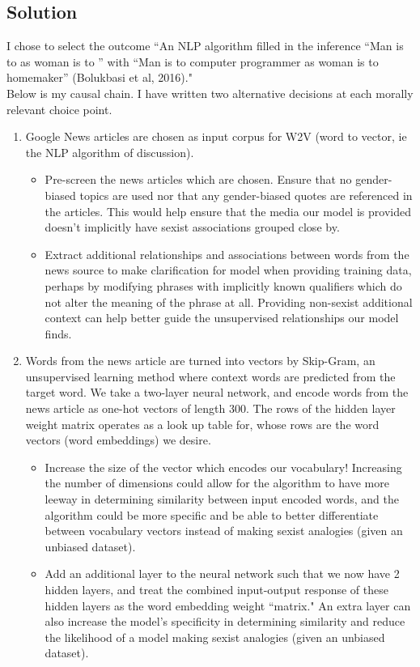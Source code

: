\documentclass[submit]{harvardml}
\begin{document}
\subsection*{Solution}
I chose to select the outcome ``An NLP algorithm filled in the inference “Man is to as woman is to ” with “Man is to computer programmer as woman is to homemaker” (Bolukbasi et al, 2016)." \\
Below is my causal chain. I have written two alternative decisions at each morally relevant choice point.
\begin{enumerate}
    \item Google News articles are chosen as input corpus for W2V (word to vector, ie the NLP algorithm of discussion).
    \begin{itemize}
        \item Pre-screen the news articles which are chosen. Ensure that no gender-biased topics are used nor that any gender-biased quotes are referenced in the articles. This would help ensure that the media our model is provided doesn't implicitly have sexist associations grouped close by.
        \item Extract additional relationships and associations between words from the news source to make clarification for model when providing training data, perhaps by modifying phrases with implicitly known qualifiers which do not alter the meaning of the phrase at all. Providing non-sexist additional context can help better guide the unsupervised relationships our model finds.
    \end{itemize}
    \item Words from the news article are turned into vectors by Skip-Gram, an unsupervised learning method where context words are predicted from the target word. We take a two-layer neural network, and encode words from the news article as one-hot vectors of length 300. The rows of the hidden layer weight matrix operates as a look up table for, whose rows are the word vectors (word embeddings) we desire.
    \begin{itemize}
        \item Increase the size of the vector which encodes our vocabulary! Increasing the number of dimensions could allow for the algorithm to have more leeway in determining similarity between input encoded words, and the algorithm could be more specific and be able to better differentiate between vocabulary vectors instead of making sexist analogies (given an unbiased dataset).
        \item Add an additional layer to the neural network such that we now have 2 hidden layers, and treat the combined input-output response of these hidden layers as the word embedding weight ``matrix." An extra layer can also increase the model's specificity in determining similarity and reduce the likelihood of a model making sexist analogies (given an unbiased dataset).

\end{itemize}
\end{enumerate}
\end{document}
